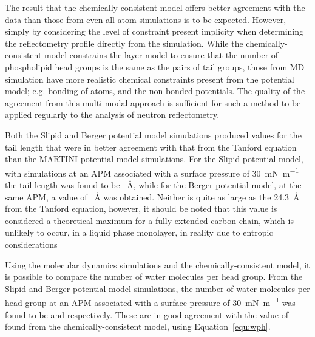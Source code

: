 The result that the chemically-consistent model offers better agreement with the data than those from even all-atom simulations is to be expected.
However, simply by considering the level of constraint present implicity when determining the reflectometry profile directly from the simulation.
While the chemically-consistent model constrains the layer model to ensure that the number of phospholipid head groups is the same as the pairs of tail groups, those from MD simulation have more realistic chemical constraints present from the potential model; e.g. bonding of atoms, and the non-bonded potentials.
The quality of the agreement from this multi-modal approach is sufficient for such a method to be applied regularly to the analysis of neutron reflectometry.

Both the Slipid and Berger potential model simulations produced values for the tail length that were in better agreement with that from the Tanford equation than the MARTINI potential model simulations.
For the Slipid potential model, with simulations at an APM associated with a surface pressure of \SI{30}{\milli\newton\per\meter} the tail length was found to be ~\si{\angstrom}, while for the Berger potential model, at the same APM, a value of ~\si{\angstrom} was obtained.
Neither is quite as large as the \SI{24.3}{\angstrom} from the Tanford equation, however, it should be noted that this value is considered a theoretical maximum for a fully extended carbon chain, which is unlikely to occur, in a liquid phase monolayer, in reality due to entropic considerations

Using the molecular dynamics simulations and the chemically-consistent model, it is possible to compare the number of water molecules per head group.
From the Slipid and Berger potential model simulations, the number of water molecules per head group at an APM associated with a surface pressure of \SI{30}{\milli\newton\per\meter} was found to be  and  respectively.
These are in good agreement with the value of  found from the chemically-consistent model, using Equation~\ref{equ:wph}.

